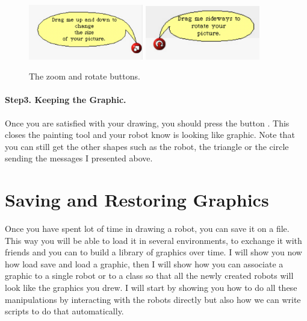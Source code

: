 \begin{figure}[h]
\begin{center}
\includegraphics[width=5cm]{zoomButton} \includegraphics[width=5cm]{rotateButton}
\end{center}
\caption{The zoom and rotate buttons. \label{fig:zoom}\label{fig:rotate}}
\end{figure}



\paragraph{Step3. Keeping the Graphic.} Once you are satisfied with your drawing, you should press the button . This closes the painting tool and your robot know is looking like graphic. Note that you can still get the other shapes such as the robot, the triangle or the circle sending the messages I presented above. 


\section{Saving and Restoring Graphics}\label{sec:saveturtle}
Once you have spent lot of time in drawing a robot, you can save it on a file. This way you will be able to load it in several environments, to exchange it with friends and you can to build a library of graphics over time. I will show you now how load save and load a graphic, then I will show how you can associate a graphic to a single robot or to a class so that all the newly created robots will look like the graphics you drew. I will start by showing you how to do all these manipulations by interacting with the robots directly but also how we can write scripts to do that automatically. 


